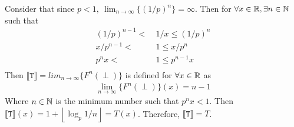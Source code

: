 Consider that since $p<1, \ \lim_{n \to \infty}\{(1/p)^n\} = \infty$. Then for $\forall x \in \mathbb{R}, \exists n \in \mathbb{N}$ such that 
\begin{align*}
(1/p)^{n-1} < \ &1/x \leq (1/p)^n \\
x/p^{n-1} < \ &1 \leq x/p^n \\
p^nx < \ &1 \leq p^{n-1}x \\
\end{align*}
Then $\llbracket \texttt{T} \rrbracket = lim_{n \to \infty}\{F^n (\perp)\}$ is defined for $\forall x \in \mathbb{R}$ as
\begin{align*}
\lim_{n \to \infty}\{F^n (\perp)\}(x) = n - 1
\end{align*}
Where $n \in \mathbb{N}$ is the minimum number such that $p^nx<1$. Then $\llbracket \texttt{T} \rrbracket(x) = 1 + \left \lfloor{\log_{p}1/n}\right \rfloor = T(x)$. Therefore, $\llbracket \texttt{T} \rrbracket = T$.
 




